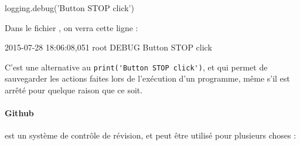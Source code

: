 \documentclass[12pt,a4paper]{report}
\begin{document}
\begin{verbatimtab}[3]
logging.debug('Button STOP click')
\end{verbatimtab}

Dans le fichier , on verra cette ligne :

\begin{verbatimtab}[3]
2015-07-28 18:06:08,051 root	DEBUG	Button STOP click
\end{verbatimtab}

C'est une alternative au \verb=print('Button STOP click')=, et qui permet de sauvegarder les actions faites lors de l'exécution d'un programme, même s'il est arrêté pour quelque raison que ce soit.

\paragraph{Github} est un système de contrôle de révision, et peut être utilisé pour plusieurs choses :
\end{document}
